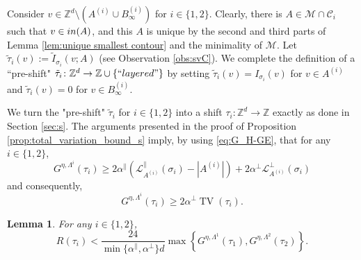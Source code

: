 \documentclass[11pt, reqno]{amsart}
\newtheorem{lemma}[theorem]{Lemma}
\newcommand{\Z}{\mathbb{Z}}
\DeclareMathOperator{\TV}{TV}
\numberwithin{equation}{section}
\begin{document}
Consider $v\in{\mathbb Z}^d\setminus(A^{(i)}\cup B^{(i)}_{\infty})$ for $i\in\{1,2\}$.
Clearly, there is $A\in\mathcal{M}\cap\mathcal{C}_i$
such that $v\in{\rm in}(A)$, and this $A$ is unique by the second and third parts of Lemma \ref{lem:unique smallest contour} and the minimality of $\mathcal M$.
Let $\tilde{\tau}_i(v):=\tilde{I}_{\sigma_i}(v;A)$ (see Observation \ref{obs:svC}).
We complete the definition of a ``pre-shift" $\tilde{\tau}_i\colon {\mathbb Z}^d \to \Z \cup\{{\rm ``layered"}\}$ by setting $\tilde{\tau}_i(v)=I_{\sigma_i}(v)$ for $v\in A^{(i)}$ and $\tilde{\tau}_i(v)=0$ for $v\in B_{\infty}^{(i)}$.

We turn the "pre-shift" $\tilde{\tau}_i$ for $i\in\{1,2\}$ into a shift ${\tau}_i\colon {\mathbb Z}^d \to{\mathbb Z}$ exactly as done in Section \ref{sec:s}. 
The arguments presented in the proof of Proposition \ref{prop:total_variation_bound_s} imply, by using \eqref{eq:G_H-GE}, that for any $i\in\{1,2\}$,
\begin{equation}\label{eq:Gsi}
G^{\eta,\Lambda^i}({\tau}_i)\geq 2\alpha^{\parallel} \left( \mathcal{L}^{\parallel}_{A^{(i)}}(\sigma_i)-|A^{(i)}|\right)+2\alpha^{\perp}\mathcal{L}^{\perp}_{A^{(i)}}(\sigma_i)
\end{equation}
and consequently,
\begin{equation}\label{eq:Gsi_TVsi}
G^{\eta,\Lambda^i}({\tau}_i)\geq 2\alpha^{\perp}\TV({\tau}_i).
\end{equation}

\begin{lemma}\label{lem:R_GG}
For any $i\in\{1,2\}$,
\begin{equation*}
R({\tau}_i)< \frac{24}{\min \{\alpha^{\parallel}, \alpha^{\perp} \} d} \max\left\{G^{\eta,\Lambda^{1}}({\tau}_1),G^{\eta,\Lambda^{2}}({\tau}_2)\right\}. 
\end{equation*}
\end{lemma}
\end{document}
